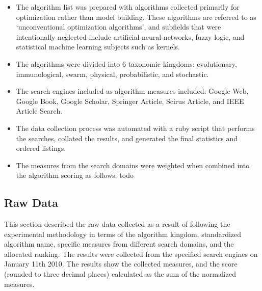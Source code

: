 \documentclass[a4paper, 11pt]{article}
\begin{document}
\begin{itemize}
	\item The algorithm list was prepared with algorithms collected primarily for optimization rather than model building. These algorithms are referred to as `unconventional optimization algorithms', and subfields that were intentionally neglected include artificial neural networks, fuzzy logic, and statistical machine learning subjects such as kernels.
	\item The algorithms were divided into 6 taxonomic kingdoms: evolutionary, immunological, swarm, physical, probabilistic, and stochastic.
	\item The search engines included as algorithm measures included: Google Web, Google Book, Google Scholar, Springer Article, Scirus Article, and IEEE Article Search.
	\item The data collection process was automated with a ruby script that performs the searches, collated the results, and generated the final statistics and ordered listings.
	\item The measures from the search domains were weighted when combined into the algorithm scoring as follows: todo
\end{itemize}

% 
% 
\subsection{Raw Data}
This section described the raw data collected as a result of following the experimental methodology in terms of the algorithm kingdom, standardized algorithm name, specific measures from different search domains, and the allocated ranking. The results were collected from the specified search engines on January 11th 2010. The results show the collected measures, and the score (rounded to three decimal places) calculated as the sum of the normalized measures.
\end{document}
